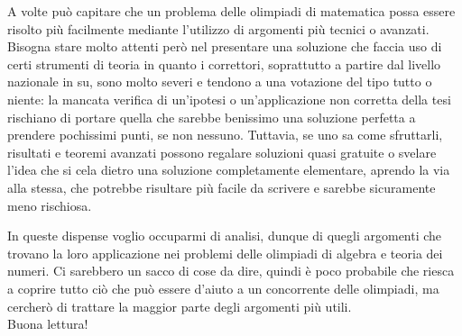 A volte può capitare che un problema delle olimpiadi di matematica possa essere risolto più facilmente mediante l'utilizzo di argomenti più tecnici o avanzati. Bisogna stare molto attenti però nel presentare una soluzione che faccia uso di certi strumenti di teoria in quanto i correttori, soprattutto a partire dal livello nazionale in su, sono molto severi e tendono a una votazione del tipo tutto o niente: la mancata verifica di un'ipotesi o un'applicazione non corretta della tesi rischiano di portare quella che sarebbe benissimo una soluzione perfetta a prendere pochissimi punti, se non nessuno. Tuttavia, se uno sa come sfruttarli, risultati e teoremi avanzati possono regalare soluzioni quasi gratuite o svelare l'idea che si cela dietro una soluzione completamente elementare, aprendo la via alla stessa, che potrebbe risultare più facile da scrivere e sarebbe sicuramente meno rischiosa.

In queste dispense voglio occuparmi di analisi, dunque di quegli argomenti che trovano la loro applicazione nei problemi delle olimpiadi di algebra e teoria dei numeri. Ci sarebbero un sacco di cose da dire, quindi è poco probabile che riesca a coprire tutto ciò che può essere d'aiuto a un concorrente delle olimpiadi, ma cercherò di trattare la maggior parte degli argomenti più utili. \\

Buona lettura!
